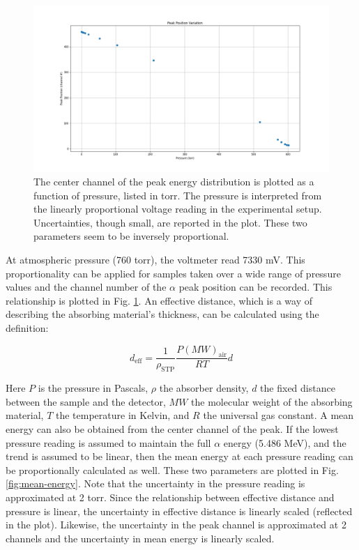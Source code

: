 \begin{figure}
\centering
\includegraphics[width=\textwidth]{peak_position.png}
\caption{The center channel of the peak energy distribution is plotted as a function of pressure, listed in torr. The pressure is interpreted from the linearly proportional voltage reading in the experimental setup. Uncertainties, though small, are reported in the plot. These two parameters seem to be inversely proportional.}
\label{fig:peak-position}
\end{figure}

At atmospheric pressure (760 torr), the voltmeter read 7330 mV. This proportionality can be applied for samples taken over a wide range of pressure values and the channel number of the $\alpha$ peak position can be recorded. This relationship is plotted in Fig. \ref{fig:peak-position}. An effective distance, which is a way of describing the absorbing material’s thickness, can be calculated using the definition:

\begin{equation}
d_{\mathrm{eff}} = \frac{1}{\rho_{\mathrm{STP}}} \frac{P(MW)_{\mathrm{air}}}{RT}d
\end{equation}

Here $P$ is the pressure in Pascals, $\rho$ the absorber density, $d$ the fixed distance between the sample and the detector, $MW$ the molecular weight of the absorbing material, $T$ the temperature in Kelvin, and $R$ the universal gas constant. A mean energy can also be obtained from the center channel of the peak. If the lowest pressure reading is assumed to maintain the full $\alpha$ energy (5.486 MeV), and the trend is assumed to be linear, then the mean energy at each pressure reading can be proportionally calculated as well. These two parameters are plotted in Fig. \ref{fig:mean-energy}. Note that the uncertainty in the pressure reading is approximated at 2 torr. Since the relationship between effective distance and pressure is linear, the uncertainty in effective distance is linearly scaled (reflected in the plot). Likewise, the uncertainty in the peak channel is approximated at 2 channels and the uncertainty in mean energy is linearly scaled.

